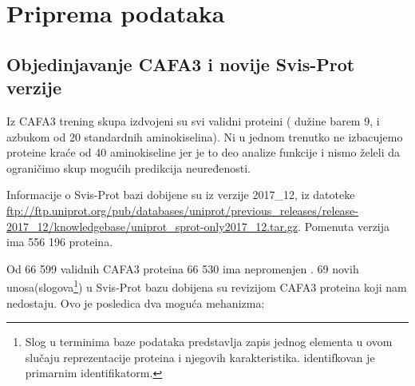 
\chapter{Priprema podataka} %

\label{Priprema_podataka} %


\section{Objedinjavanje CAFA3 i novije Svis-Prot verzije}

Iz CAFA3 trening skupa izdvojeni su svi validni proteini ( dužine barem 9, i
azbukom od 20 standardnih aminokiselina). Ni u jednom trenutko ne izbacujemo
proteine kraće od 40 aminokiseline jer je to deo analize funkcije i nismo želeli
da ograničimo skup mogućih predikcija neuređenosti.

Informacije o Svis-Prot bazi dobijene su iz verzije 2017\_12, iz datoteke
\url{ftp://ftp.uniprot.org/pub/databases/uniprot/previous_releases/release-2017_12/knowledgebase/uniprot_sprot-only2017_12.tar.gz}.
Pomenuta verzija ima 556 196 proteina. 

Od 66 599 validnih CAFA3 proteina 66 530 ima nepromenjen  .  69 novih unosa(slogova\footnote{ Slog
   u terminima baze podataka predstavlja zapis jednog elementa u
ovom slučaju reprezentacije proteina i njegovih karakteristika.  identifkovan
je primarnim identifikatorm.  }) u Svis-Prot bazu dobijena su revizijom CAFA3
proteina koji nam nedostaju.  Ovo je posledica dva moguća mehanizma:

